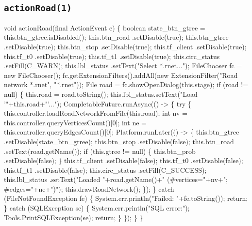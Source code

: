 \subsection{\texttt{actionRoad(1)}}
\nwenddocs{}\endmoddef{}
void actionRoad(final ActionEvent e) \{
  boolean state_btn_gtree = this.btn_gtree.isDisabled();
  this.btn_road     .setDisable(true);
  this.btn_gtree    .setDisable(true);
  this.btn_stop     .setDisable(true);
  this.tf_client     .setDisable(true);
  this.tf_t0        .setDisable(true);
  this.tf_t1        .setDisable(true);
  this.circ_status  .setFill(C_WARN);
  this.lbl_status   .setText("Select *.rnet...");
  FileChooser fc = new FileChooser();
  fc.getExtensionFilters().addAll(new ExtensionFilter("Road network *.rnet", "*.rnet"));
  File road = fc.showOpenDialog(this.stage);
  if (road != null) \{
    this.road = road.toString();
    this.lbl_status.setText("Load '"+this.road+"'...");
    CompletableFuture.runAsync(() -> \{
      try \{
        this.controller.loadRoadNetworkFromFile(this.road);
        int nv = this.controller.queryVerticesCount()[0];
        int ne = this.controller.queryEdgesCount()[0];
        Platform.runLater(() -> \{
          this.btn_gtree    .setDisable(state_btn_gtree);
          this.btn_stop     .setDisable(false);
          this.btn_road     .setText(road.getName());
          if (this.gtree != null) \{
            this.btn_prob   .setDisable(false);
          \}
          this.tf_client     .setDisable(false);
          this.tf_t0        .setDisable(false);
          this.tf_t1        .setDisable(false);
          this.circ_status  .setFill(C_SUCCESS);
          this.lbl_status   .setText("Loaded "+road.getName()+" (#vertices="+nv+"; #edges="+ne+")");
          this.drawRoadNetwork();
        \});
      \} catch (FileNotFoundException fe) \{
        System.err.println("Failed: "+fe.toString());
        return;
      \} catch (SQLException se) \{
        System.err.println("SQL error:");
        Tools.PrintSQLException(se);
        return;
      \}
    \});
  \}
\}
\nwendcode{}\nwdocspar

